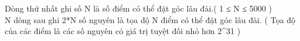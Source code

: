 Dòng thứ nhất ghi số N là số điểm có thể đặt góc lâu đài.( 1 ≤ N ≤ 5000 )
\\N dòng sau ghi 2*N số nguyên là tọa độ N điểm có thể đặt góc lâu đài. ( Tọa độ của các điểm là các số nguyên có giá trị tuyệt đối nhỏ hơn 2^31 )